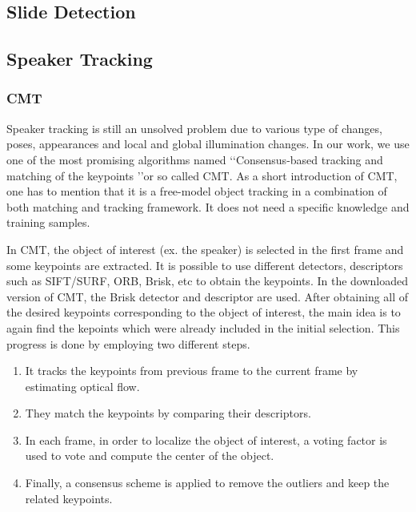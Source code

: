 \documentclass[[12pt,DIV14,BCOR12mm,a4paper,footexclude,headinclude,halfparskip-,twoside,openright,cleardoubleempty,idxtotoc,bibtotoc]{article}
\begin{document}
\subsection{Slide Detection}

\subsection{Speaker Tracking}


\subsubsection{CMT}
Speaker tracking is still an unsolved problem due to various type of changes, poses, appearances and local and global illumination changes. In our work, we use one of the most promising algorithms named \lq\lq Consensus-based tracking and matching of the keypoints \rq\rq or so called CMT. As a short introduction of CMT, one has to mention that it is a free-model object tracking in a combination of both matching and tracking framework. It does not need a specific knowledge  and training samples. 

In CMT, the object of interest (ex. the speaker) is selected in the first frame and some keypoints are extracted. It is possible to use different detectors, descriptors such as SIFT/SURF, ORB, Brisk, etc to obtain the keypoints. In the downloaded version of CMT, the Brisk detector and descriptor are used. After obtaining all of the desired keypoints corresponding to the object of interest, the main idea is to again find the kepoints which were already included in the initial selection. This progress is done by employing two different steps.

\begin{enumerate}

\item It tracks the keypoints from previous frame to the current frame by estimating optical flow.
\item They match the keypoints by comparing their descriptors.
\item In each frame, in order to localize the object of interest, a voting factor is used to vote and compute the center of the object.
\item Finally, a consensus scheme is applied to remove the outliers and keep the related keypoints.
\end{enumerate}
\end{document}
